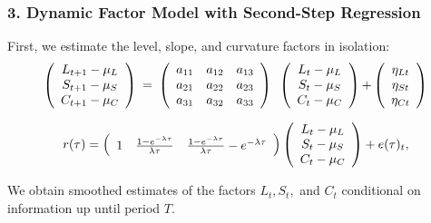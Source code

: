\documentclass[handout]{beamer}
\begin{document}
\begin{frame}

\frametitle{3. Dynamic Factor Model with Second-Step Regression}

First, we estimate the level, slope, and curvature factors in isolation:
\begin{equation*}
\left(
\begin{array}{c}
{L_{t+1}-\mu _{L}} \\
{S_{t+1}-\mu _{S}} \\
{C_{t+1}-\mu _{C}}%
\end{array}%
\right) {\normalsize \ =\ }\left(
\begin{array}{ccc}
a_{11} & a_{12} & a_{13} \\
a_{21} & a_{22} & a_{23} \\
a_{31} & a_{32} & a_{33}%
\end{array}%
\right) {\normalsize \ }\left(
\begin{array}{c}
{L_{t}-\mu _{L}} \\
{S_{t}-\mu _{S}} \\
{C_{t}-\mu _{C}}%
\end{array}%
\right) {\normalsize +}\left(
\begin{array}{c}
{\eta _{Lt}} \\
{\eta _{St}} \\
{\eta _{Ct}}%
\end{array}%
\right)
\end{equation*}

\begin{equation*}
r(\tau )=\left(
\begin{array}{ccc}
1 & \frac{1-e^{-\lambda \tau }}{\lambda \tau } & \frac{1-e^{-\lambda \tau }}{%
\lambda \tau }-e^{-\lambda \tau }%
\end{array}%
\right) \left(
\begin{array}{c}
{L_{t}-\mu _{L}} \\
{S_{t}-\mu _{S}} \\
{C_{t}-\mu _{C}}
\end{array}%
\right) +e(\tau )_{t},
\end{equation*}

We obtain smoothed estimates of the factors $L_{t},S_{t},$ and $C_{t}$
conditional on information up until period $T.$
\end{frame}
\end{document}
